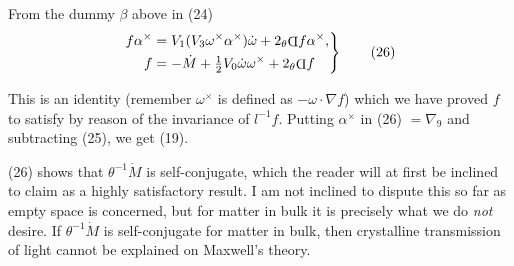\documentclass[11pt]{article}
\newcommand{\invd}{\mathord{\vcenter{\hbox{\rotatebox[origin=c]{180}{\(\mathrm{D}\)}}}}}
\newcommand{\thetaPi}{{}_\theta\invd}
\begin{document}
From the dummy $\beta$ above in (24)
\begin{equation}
  \left.\begin{aligned}
    f\alpha^\times&=V_1(V_3\omega^\times\alpha^\times)\dot\omega+2\thetaPi f\alpha^\times,\\
    f&=-\dot M+\tfrac12V_0\dot\omega\omega^\times+2\thetaPi f
  \end{aligned}\right\}
  \tag{26}
\end{equation}

This is an identity (remember $\omega^\times$ is defined as $-\omega\mathbin{\cdot}\nabla f$) which we have proved $f$ to satisfy by reason of the invariance of $l^{-1}f$. Putting $\alpha^\times$ in (26) $=\nabla_9$ and subtracting (25), we get (19).

\indent (26) shows that $\theta^{-1}\dot M$ is self-conjugate, which the reader will at first be inclined to claim as a highly satisfactory result. I am not inclined to dispute this so far as empty space is concerned, but for matter in bulk it is precisely what we do \emph{not} desire. If $\theta^{-1}\dot M$ is self-conjugate for matter in bulk, then crystalline transmission of light cannot be explained on Maxwell's theory.
\end{document}
